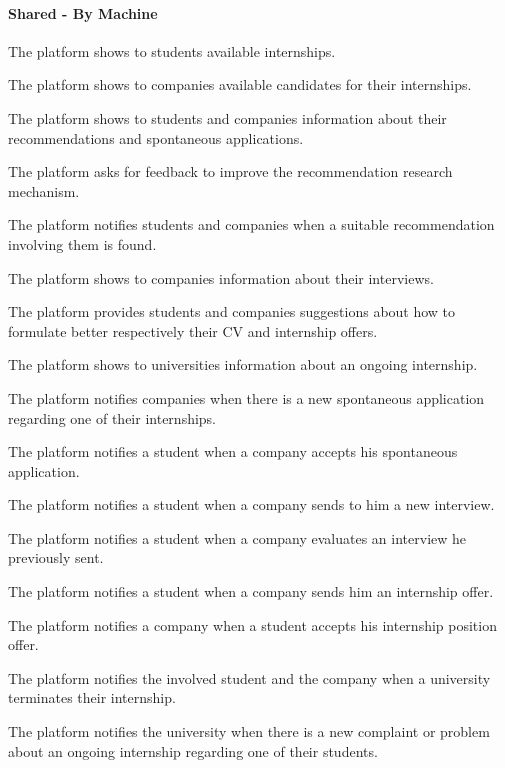 \paragraph{Shared - By Machine}
\begin{enumerate}[label={\color{titleColor}[SPM\arabic*]}]
    \item The platform shows to students available internships.
\item The platform shows to companies available candidates for their internships.
\item The platform shows to students and companies information about their recommendations and spontaneous applications.
\item The platform asks for feedback to improve the recommendation research mechanism.
\item The platform notifies students and companies when a suitable recommendation involving them is found.
\item The platform shows to companies information about their interviews.
\item The platform provides students and companies suggestions about how to formulate better respectively their CV and internship offers.
\item The platform shows to universities information about an ongoing internship.
\item The platform notifies companies when there is a new spontaneous application regarding one of their internships.
\item The platform notifies a student when a company accepts his spontaneous application.
\item The platform notifies a student when a company sends to him a new interview.
\item The platform notifies a student when a company evaluates an interview he previously sent.
\item The platform notifies a student when a company sends him an internship offer.
\item The platform notifies a company when a student accepts his internship position offer.
\item The platform notifies the involved student and the company when a university terminates their internship.
\item The platform notifies the university when there is a new complaint or problem about an ongoing internship regarding one of their students.

\end{enumerate}
